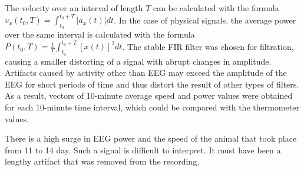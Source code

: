 \documentclass[14pt,a4paper]{scrartcl}
\begin{document}
\begin{figure}[H]
\begin{minipage}{.5\textwidth}
  \label{fig:exp1_4}
\end{minipage}
\end{figure}

The velocity over an interval of length $T$ can be calculated with the formula $ v_{x} (t_0, T) = \int_{t_0}^{t_0+T} | a_{x} (t) | dt $. In the case of physical signals, the average power over the same interval is calculated with the formula $ P (t_0, T) = \frac{1}{T}\int_{t_0}^{t_0+T}[x(t)]^2 dt $. The stable FIR filter was chosen for filtration, causing a smaller distorting of a signal with abrupt changes in amplitude. Artifacts caused by activity other than EEG may exceed the amplitude of the EEG for short periods of time and thus distort the result of other types of filters. As a result, vectors of 10-minute average speed and power values were obtained for each 10-minute time interval, which could be compared with the thermometer values. 

There is a high surge in EEG power and the speed of the animal that took place from 11 to 14 day. Such a signal is difficult to interpret. It must have been a lengthy artifact that was removed from the recording. 
\end{document}
